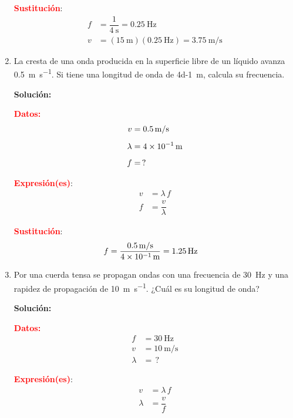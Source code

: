 \documentclass[14pt]{extarticle}
\newcommand{\textocolor}[2]{\textbf{\textcolor{#1}{#2}}}
\begin{document}
\begin{enumerate}
\begin{minipage}{0.5\linewidth}
\noindent
\textocolor{red}{Sustitución}:
\begin{align*}
f &= \dfrac{1}{\SI{4}{\second}} = \SI{0.25}{\hertz} \\
v &= (\SI{15}{\meter})(\SI{0.25}{\hertz}) = \SI{3.75}{\meter\per\second}
\end{align*}
\end{minipage}
\item La cresta de una onda producida en la superficie libre de un líquido avanza \SI{0.5}{\meter\per\second}. Si tiene una longitud de onda de \SI{4d-1}{\meter}, calcula su frecuencia.

\textbf{Solución:}

\begin{minipage}[t]{0.35\linewidth}
\noindent
\textocolor{red}{Datos:}
\begin{align*}
v &= \SI{0.5}{\meter\per\second} \\[0.5em]
\lambda &= \SI{4d-1}{\meter} \\[0.5em]
f &= \, ?
\end{align*}
\end{minipage}
\hspace{1cm}
\begin{minipage}[t]{0.35\linewidth}
\noindent
\textocolor{red}{Expresión(es)}:
\begin{align*}
v &= \lambda \, f \\[0.5em]
f &= \dfrac{v}{\lambda}
\end{align*}
\end{minipage}

\begin{minipage}{0.5\linewidth}
\noindent
\textocolor{red}{Sustitución}:
\begin{align*}
f &= \dfrac{\SI{0.5}{\meter\per\second}}{\SI{4d-1}{\meter}} = \SI{1.25}{\hertz}
\end{align*}
\end{minipage}
\item Por una cuerda tensa se propagan ondas con una frecuencia de \SI{30}{\hertz} y una rapidez de propagación de \SI{10}{\meter\per\second}. ¿Cuál es su longitud de onda?

\textbf{Solución:}

\begin{minipage}[t]{0.35\linewidth}
\noindent
\textocolor{red}{Datos:}
\begin{align*}
f &= \SI{30}{\hertz} \\[0.5em]
v &= \SI{10}{\meter\per\second} \\[0.5em]
\lambda &= \, ?
\end{align*}
\end{minipage}
\hspace{1cm}
\begin{minipage}[t]{0.35\linewidth}
\noindent
\textocolor{red}{Expresión(es)}:
\begin{align*}
v &= \lambda \, f \\[0.5em]
\lambda &= \dfrac{v}{f}
\end{align*}
\end{minipage}


\end{enumerate}
\end{document}
